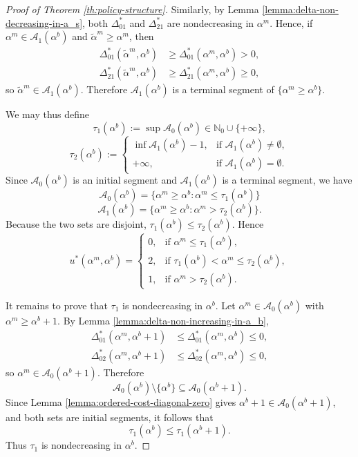 \documentclass[10pt,a4paper]{amsart}
\begin{document}
\begin{proof}[Proof of Theorem \ref{th:policy-structure}]
Similarly, by Lemma \ref{lemma:delta-non-decreasing-in-a_s}, both
$\Delta^*_{01}$ and $\Delta^*_{21}$ are nondecreasing in
$\alpha^m$. Hence, if $\alpha^m\in\mathcal A_1(\alpha^b)$ and $\tilde\alpha^m\ge \alpha^m$, then
\begin{align*}
\Delta^*_{01}(\tilde\alpha^m,\alpha^b)
&\ge \Delta^*_{01}(\alpha^m,\alpha^b)>0,\\
\Delta^*_{21}(\tilde\alpha^m,\alpha^b)
&\ge \Delta^*_{21}(\alpha^m,\alpha^b)\ge 0,
\end{align*}
so $\tilde\alpha^m\in\mathcal A_1(\alpha^b)$. Therefore $\mathcal A_1(\alpha^b)$ is a terminal
segment of $\{\alpha^m\ge \alpha^b\}$.

We may thus define
\[
\tau_1(\alpha^b):=\sup \mathcal A_0(\alpha^b)\in \mathbb N_0\cup\{+\infty\},
\]
\[
\tau_2(\alpha^b):=
\begin{cases}
\inf \mathcal A_1(\alpha^b)-1, & \text{if } \mathcal A_1(\alpha^b)\neq\emptyset,\\
+\infty, & \text{if } \mathcal A_1(\alpha^b)=\emptyset.
\end{cases}
\]
Since $\mathcal A_0(\alpha^b)$ is an initial segment and $\mathcal A_1(\alpha^b)$ is a terminal
segment, we have
\[
\mathcal A_0(\alpha^b)=\{\alpha^m\ge \alpha^b:\alpha^m\le \tau_1(\alpha^b)\}
\]
\[
\mathcal A_1(\alpha^b)=\{\alpha^m\ge \alpha^b:\alpha^m>\tau_2(\alpha^b)\}.
\]
Because the two sets are disjoint, $\tau_1(\alpha^b)\le \tau_2(\alpha^b)$. Hence
\[
u^*(\alpha^m,\alpha^b)=
\begin{cases}
0, & \text{if } \alpha^m\le \tau_1(\alpha^b),\\
2, & \text{if } \tau_1(\alpha^b)<\alpha^m\le \tau_2(\alpha^b),\\
1, & \text{if } \alpha^m>\tau_2(\alpha^b).
\end{cases}
\]

It remains to prove that $\tau_1$ is nondecreasing in $\alpha^b$. Let
$\alpha^m\in\mathcal A_0(\alpha^b)$ with $\alpha^m\ge \alpha^b+1$. By
Lemma \ref{lemma:delta-non-increasing-in-a_b},
\begin{align*}
\Delta^*_{01}(\alpha^m,\alpha^b+1)
&\le \Delta^*_{01}(\alpha^m,\alpha^b)\le 0,\\
\Delta^*_{02}(\alpha^m,\alpha^b+1)
&\le \Delta^*_{02}(\alpha^m,\alpha^b)\le 0,
\end{align*}
so $\alpha^m\in\mathcal A_0(\alpha^b+1)$. Therefore
\[
\mathcal A_0(\alpha^b)\setminus\{\alpha^b\}\subseteq \mathcal A_0(\alpha^b+1).
\]
Since Lemma \ref{lemma:ordered-cost-diagonal-zero} gives
$\alpha^b+1\in\mathcal A_0(\alpha^b+1)$, and both sets are initial segments, it follows that
\[
\tau_1(\alpha^b)\le \tau_1(\alpha^b+1).
\]
Thus $\tau_1$ is nondecreasing in $\alpha^b$.
\end{proof}
\end{document}
